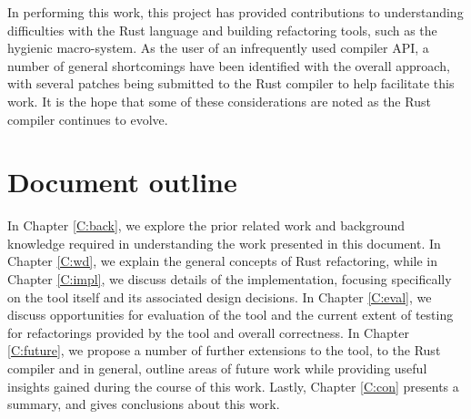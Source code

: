 In performing this work, this project has provided contributions to understanding difficulties with the Rust language and building refactoring tools, such as the hygienic macro-system. As the user of an infrequently used compiler API, a number of general shortcomings have been identified with the overall approach, with several patches being submitted to the Rust compiler to help facilitate this work. It is the hope that some of these considerations are noted as the Rust compiler continues to evolve.

\section{Document outline}\label{S:outline}
In Chapter \ref{C:back}, we explore the prior related work and background knowledge required in understanding the work presented in this document. In Chapter \ref{C:wd}, we explain the general concepts of Rust refactoring, while in Chapter \ref{C:impl}, we discuss details of the implementation, focusing specifically on the tool itself and its associated design decisions. In Chapter \ref{C:eval}, we discuss opportunities for evaluation of the tool and the current extent of testing for refactorings provided by the tool and overall correctness. In Chapter \ref{C:future}, we propose a number of further extensions to the tool, to the Rust compiler and in general, outline areas of future work while providing useful insights gained during the course of this work. Lastly, Chapter \ref{C:con} presents a summary, and gives conclusions about this work.